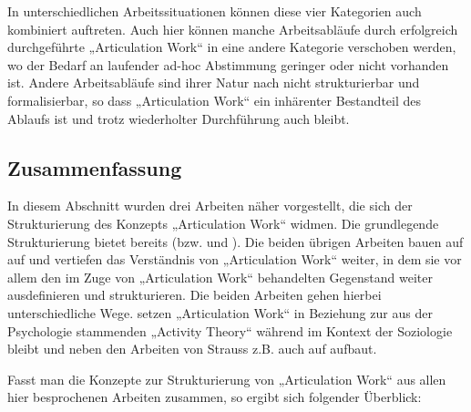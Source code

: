 In unterschiedlichen Arbeitssituationen können diese vier Kategorien auch kombiniert auftreten. Auch hier können manche Arbeitsabläufe durch erfolgreich durchgeführte „Articulation Work“ in eine andere Kategorie verschoben werden, wo der Bedarf an laufender ad-hoc Abstimmung geringer oder nicht vorhanden ist. Andere Arbeitsabläufe sind ihrer Natur nach nicht strukturierbar und formalisierbar, so dass „Articulation Work“ ein inhärenter Bestandteil des Ablaufs ist und trotz wiederholter Durchführung auch bleibt.

\subsection{Zusammenfassung} %
\label{sub:aw_zusammenfassung}

In diesem Abschnitt wurden drei Arbeiten näher vorgestellt, die sich der  Strukturierung des Konzepts „Articulation Work“ widmen. Die grundlegende Strukturierung bietet bereits \citet{Strauss85} (bzw. \citet{Strauss88} und \citet{Strauss93}). Die beiden übrigen Arbeiten bauen auf \citeauthor{Strauss85} auf und vertiefen das Verständnis von „Articulation Work“ weiter, in dem sie vor allem den im Zuge von „Articulation Work“ behandelten Gegenstand weiter ausdefinieren und strukturieren. Die beiden Arbeiten gehen hierbei unterschiedliche Wege. \citet{Fjuk97} setzen „Articulation Work“ in Beziehung zur aus der Psychologie stammenden „Activity Theory“ während \citet{Hampson05} im Kontext der Soziologie bleibt und neben den Arbeiten von Strauss z.B. auch auf \citep{Star99} aufbaut.

Fasst man die Konzepte zur Strukturierung von „Articulation Work“ aus allen hier besprochenen Arbeiten zusammen, so ergibt sich folgender Überblick: 

